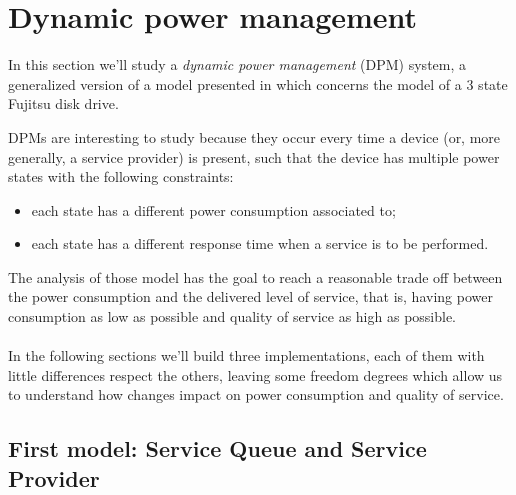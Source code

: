 \section{Dynamic power management}

In this section we'll study a \emph{dynamic power management} (DPM)
system, a generalized version of a model presented in \cite{QWP99}
which concerns the model of a 3 state Fujitsu disk drive.

DPMs are interesting to study because they occur every time a device
(or, more generally, a service provider) is present, such that the
device has multiple power states with the following constraints:
\begin{itemize}
\item each state has a different power consumption associated to;
\item each state has a different response time when a service is to be
  performed.
\end{itemize}
The analysis of those model has the goal to reach a reasonable
trade off between the power consumption and the delivered level of
service, that is, having power consumption as low as possible and
quality of service as high as possible.
\\\\
In the following sections we'll build three implementations, each of
them with little differences respect the others, leaving some freedom
degrees which allow us to understand how changes impact on power
consumption and quality of service.

\subsection{First model: Service Queue and Service Provider}

